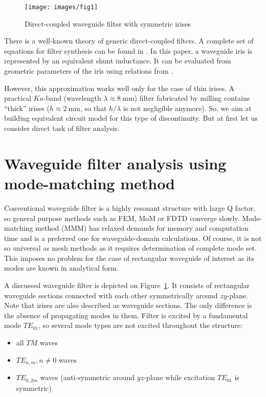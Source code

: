 \documentclass{pj}
\begin{document}
\begin{figure}[h]
  \centering
  \texttt{[image: images/fig1]}
  \caption{Direct-coupled waveguide filter with symmetric irises}
  \label{fig:1}
\end{figure}

There is a well-known theory of generic direct-coupled filters. A
complete set of equations for filter synthesis can be found in
\cite{cohn1957}. In this paper, a waveguide iris is represented by an
equivalent shunt inductance. It can be evaluated from geometric
parameters of the iris using relations from \cite{matthaei1980}.

However, this approximation works well only for the case of thin
irises. A practical $Ka$-band (wavelength
$\lambda \approx 8~\mathrm{mm}$) filter fabricated by milling contains
``thick'' irises ($h \approx 2~\mathrm{mm}$, so that $h/\lambda$ is not
negligible anymore). So, we aim at building equivalent circuit model
for this type of discontinuity. But at first let us consider direct
task of filter analysis.

\section{Waveguide filter analysis using mode-matching method}
\label{sec:mode-matching-method}

Conventional waveguide filter is a highly resonant structure with
large Q factor, so general purpose methods such as FEM, MoM or FDTD
converge slowly. Mode-matching method (MMM) has relaxed demands for
memory and computation time and is a preferred one for
waveguide-domain calculations. Of course, it is not so universal as
mesh methods as it requires determination of complete mode
set. This imposes no problem for the case of rectangular waveguide of
interest as its modes are known in analytical form.

A discussed waveguide filter is depicted on
Figure~\ref{fig:1}. It consists of rectangular waveguide
sections connected with each other symmetrically around
$zy$-plane. Note that irises are also described as waveguide
sections. The only difference is the absence of propagating modes in
them. Filter is excited by a fundamental mode $TE_{01}$, so several
mode types are not excited throughout the structure:

\begin{itemize}
\item all $TM$ waves  
\item $TE_{n, m}, n \ne 0$ waves 
\item $TE_{0, 2m}$ waves (anti-symmetric around $yz$-plane while
  excitation $TE_{01}$ is symmetric).
\end{itemize}
\end{document}
